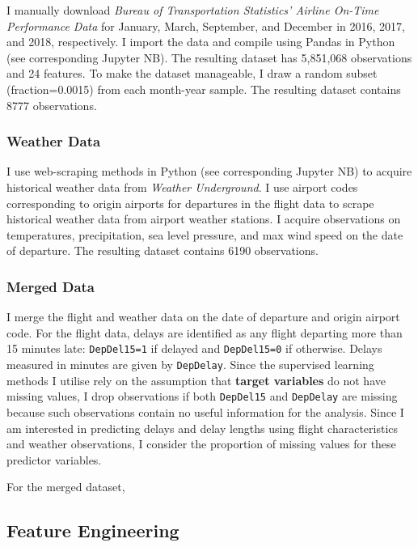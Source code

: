 \documentclass[
]{article}
\begin{document}
I manually download
\textit{Bureau of Transportation Statistics' Airline On-Time Performance Data}
for January, March, September, and December in 2016, 2017, and 2018,
respectively. I import the data and compile using Pandas in Python (see
corresponding Jupyter NB). The resulting dataset has 5,851,068
observations and 24 features. To make the dataset manageable, I draw a
random subset (fraction=0.0015) from each month-year sample. The
resulting dataset contains 8777 observations.

\subsubsection{Weather Data}

I use web-scraping methods in Python (see corresponding Jupyter NB) to
acquire historical weather data from \textit{Weather Underground}. I use
airport codes corresponding to origin airports for departures in the
flight data to scrape historical weather data from airport weather
stations. I acquire observations on temperatures, precipitation, sea
level pressure, and max wind speed on the date of departure. The
resulting dataset contains 6190 observations.

\subsubsection{Merged Data}

I merge the flight and weather data on the date of departure and origin
airport code. For the flight data, delays are identified as any flight
departing more than 15 minutes late: \texttt{DepDel15=1} if delayed and
\texttt{DepDel15=0} if otherwise. Delays measured in minutes are given
by \texttt{DepDelay}. Since the supervised learning methods I utilise
rely on the assumption that \textbf{target variables} do not have
missing values, I drop observations if both \texttt{DepDel15} and
\texttt{DepDelay} are missing because such observations contain no
useful information for the analysis. Since I am interested in predicting
delays and delay lengths using flight characteristics and weather
observations, I consider the proportion of missing values for these
predictor variables.

For the merged dataset,

\subsection{Feature Engineering}
\end{document}
